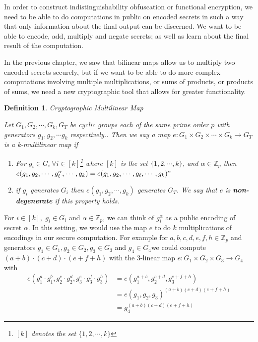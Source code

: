 \documentclass[12pt,twoside]{reedthesis}
\newtheorem{definition}{Definition}
\newcommand{\Z}[0]{\mathbb{Z}}
\begin{document}
    In order to construct indistinguishability obfuscation or functional encryption, we need to be able to do computations in public on encoded secrets in such a way that only information about the final output can be discerned. We want to be able to encode, add, multiply and negate secrets; as well as learn about the final result of the computation.
    \par In the previous chapter, we saw that bilinear maps allow us to multiply two encoded secrets securely, but if we want to be able to do more complex computations involving multiple multiplications, or sums of products, or products of sums, we need a new cryptographic tool that allows for greater functionality. 
    \begin{definition}{Cryptographic Multilinear Map}
    \par Let $G_1,G_2, \cdots, G_k,G_T$ be cyclic groups each of the same prime order $p$ with generators $g_1,g_2,\cdots g_k$ respectively.. Then we say a map $e:G_1 \times G_2 \times \cdots \times G_k \rightarrow G_T$ is a k-multilinear map if
    
    \begin{enumerate}
    \item For $g_i \in G_i \: \forall i \in [k]$\footnote{$[k]$ denotes the set $\{ 1, 2,\cdots, k \}$} where $[k]$ is the set $\{1,2,\cdots,k \}$, and $\alpha \in \mathbb{Z}_p$ then $e(g_1, g_2, \cdots,g_\ell^\alpha , \cdots , g_k) =e(g_1, g_2, \cdots, g_\ell , \cdots , g_k)^\alpha \\$
    \item if $g_i$ generates $G_i$ then $e(g_1,g_2,\cdots , g_k)$ generates $G_T$. We say that $e$ is \textbf{non-degenerate} if this property holds.
    \end{enumerate}
    \end{definition}
       
       For $i\in[k], \; g_i \in G_i$ and $\alpha \in \Z_p$, we can think of $g_i^\alpha$ as a public encoding of secret $\alpha$. In this setting, we would use the map $e$ to do $k$ multiplications of encodings in our secure computation. For example for $a,b,c,d,e,f,h \in \Z_p$ and generators $g_1 \in G_1, g_2\in G_2, g_3\in G_3$ and $g_4 \in G_4$we could compute $(a+b)\cdot(c+d)\cdot(e+f+h)$ with the $3$-linear map $e:G_1\times G_2 \times G_3 \to G_4$ with 
 \begin{align*}      
 e(g_1^a \cdot g_1^b,g_2^c\cdot g_2^d,g_3^e\cdot g_3^f \cdot g_3^h)&=e(g_1^{a +b},g_2^{c+d},g_3^{e+f+h})\\
 &= e(g_1,g_2,g_3)^{(a+b)(c+d)(e+f+h)} \\
 &=g_4^{(a+b)(c+d)(e+f+h)}
 \end{align*}
 
\end{document}

